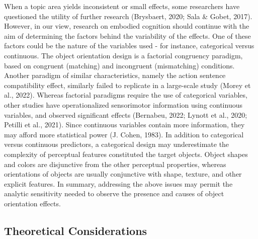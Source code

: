 \documentclass[
  man,mask,floatsintext]{apa7}
\begin{document}
When a topic area yields inconsistent or small effects, some researchers
have questioned the utility of further research (Brysbaert, 2020; Sala \& Gobet, 2017). However, in our view, research on embodied cognition should
continue with the aim of determining the factors behind the variability
of the effects. One of these factors could be the nature of the
variables used - for instance, categorical versus continuous. The object
orientation design is a factorial congruency paradigm, based on
congruent (matching) and incongruent (mismatching) conditions. Another
paradigm of similar characteristics, namely the action sentence
compatibility effect, similarly failed to replicate in a large-scale
study (Morey et al., 2022). Whereas factorial paradigms require the use of
categorical variables, other studies have operationalized sensorimotor
information using continuous variables, and observed significant effects
(Bernabeu, 2022; Lynott et al., 2020; Petilli et al., 2021). Since continuous variables
contain more information, they may afford more statistical power
(J. Cohen, 1983). In addition to categorical versus continuous predictors, a
categorical design may underestimate the complexity of perceptual
features constituted the target objects. Object shapes and colors are
disjunctive from the other perceptual properties, whereas orientations
of objects are usually conjunctive with shape, texture, and other
explicit features. In summary, addressing the above issues may permit
the analytic sensitivity needed to observe the presence and causes of
object orientation effects.

\hypertarget{theoretical-considerations}{%
\subsection{Theoretical Considerations}\label{theoretical-considerations}}
\end{document}
